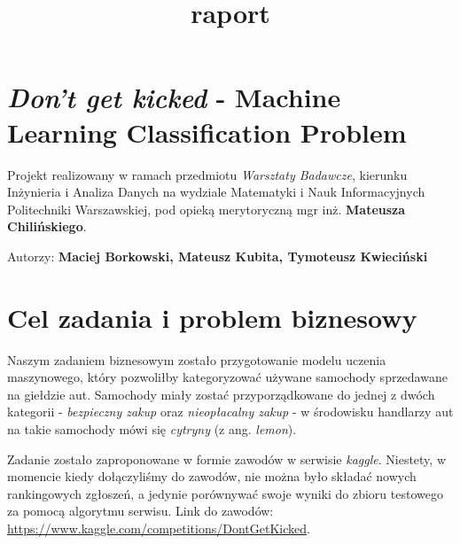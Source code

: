 \documentclass[11pt]{article}
\title{raport}
\begin{document}
    
    \maketitle
    
    

    
    \hypertarget{dont-get-kicked---machine-learning-classification-problem}{%
\section{\texorpdfstring{\emph{Don't get kicked} - Machine Learning
Classification
Problem}{Don't get kicked - Machine Learning Classification Problem}}\label{dont-get-kicked---machine-learning-classification-problem}}

Projekt realizowany w ramach przedmiotu \emph{Warsztaty Badawcze},
kierunku Inżynieria i Analiza Danych na wydziale Matematyki i Nauk
Informacyjnych Politechniki Warszawskiej, pod opieką merytoryczną mgr
inż. \textbf{Mateusza Chilińskiego}.

Autorzy: \textbf{Maciej Borkowski, Mateusz Kubita, Tymoteusz Kwieciński}

    \hypertarget{cel-zadania-i-problem-biznesowy}{%
\section{Cel zadania i problem
biznesowy}\label{cel-zadania-i-problem-biznesowy}}

Naszym zadaniem biznesowym zostało przygotowanie modelu uczenia
maszynowego, który pozwoliłby kategoryzować używane samochody
sprzedawane na giełdzie aut. Samochody miały zostać przyporządkowane do
jednej z dwóch kategorii - \emph{bezpieczny zakup} oraz
\emph{nieopłacalny zakup} - w środowisku handlarzy aut na takie
samochody mówi się \emph{cytryny} (z ang. \emph{lemon}).

Zadanie zostało zaproponowane w formie zawodów w serwisie \emph{kaggle}.
Niestety, w momencie kiedy dołączyliśmy do zawodów, nie można było
składać nowych rankingowych zgłoszeń, a jedynie porównywać swoje wyniki
do zbioru testowego za pomocą algorytmu serwisu. Link do zawodów:
\url{https://www.kaggle.com/competitions/DontGetKicked}.
\end{document}
